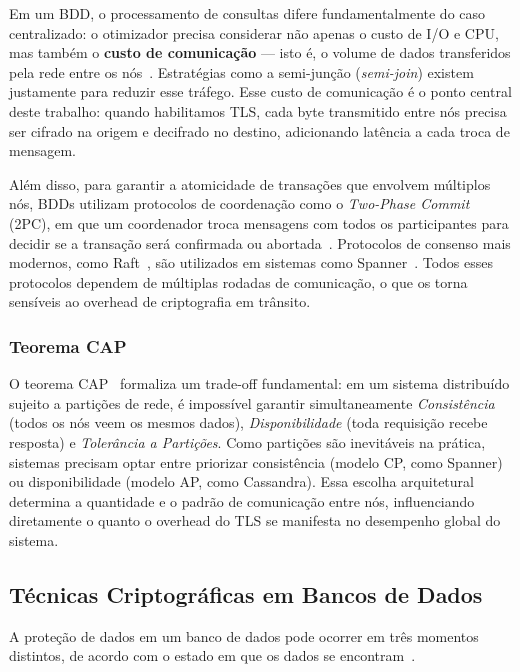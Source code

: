 \documentclass[12pt]{article}
\begin{document}
Em um BDD, o processamento de consultas difere fundamentalmente do caso
centralizado: o otimizador precisa considerar não apenas o custo de I/O e CPU,
mas também o \textbf{custo de comunicação} --- isto é, o volume de dados
transferidos pela rede entre os nós~\cite{elmasri2016fundamentals}. Estratégias
como a semi-junção (\emph{semi-join}) existem justamente para reduzir esse
tráfego. Esse custo de comunicação é o ponto central deste trabalho: quando
habilitamos TLS, cada byte transmitido entre nós precisa ser cifrado na origem
e decifrado no destino, adicionando latência a cada troca de mensagem.

Além disso, para garantir a atomicidade de transações que envolvem múltiplos
nós, BDDs utilizam protocolos de coordenação como o \emph{Two-Phase Commit}
(2PC), em que um coordenador troca mensagens com todos os participantes para
decidir se a transação será confirmada ou abortada~\cite{elmasri2016fundamentals}.
Protocolos de consenso mais modernos, como
Raft~\cite{ongaro2014raft}, são utilizados em sistemas como
Spanner~\cite{corbett2012spanner}. Todos esses protocolos dependem de múltiplas
rodadas de comunicação, o que os torna sensíveis ao overhead de criptografia em
trânsito.

\subsubsection{Teorema CAP}

O teorema CAP~\cite{gilbert2002cap} formaliza um trade-off fundamental: em um
sistema distribuído sujeito a partições de rede, é impossível garantir
simultaneamente \emph{Consistência} (todos os nós veem os mesmos dados),
\emph{Disponibilidade} (toda requisição recebe resposta) e \emph{Tolerância a
Partições}. Como partições são inevitáveis na prática, sistemas precisam optar
entre priorizar consistência (modelo CP, como Spanner) ou disponibilidade
(modelo AP, como Cassandra). Essa escolha arquitetural determina a quantidade
e o padrão de comunicação entre nós, influenciando diretamente o quanto o
overhead do TLS se manifesta no desempenho global do sistema.

\subsection{Técnicas Criptográficas em Bancos de Dados}
\label{sec:conc-cripto}

A proteção de dados em um banco de dados pode ocorrer em três momentos
distintos, de acordo com o estado em que os dados se
encontram~\cite{nist2020sp80053r5}.
\end{document}
